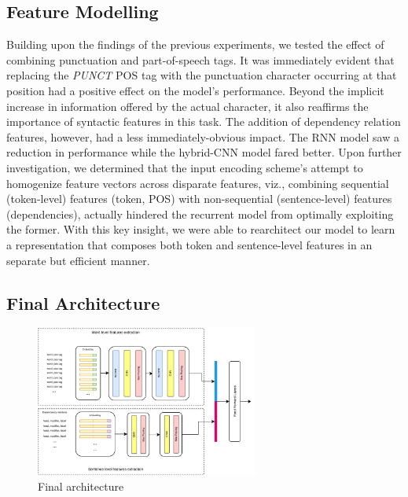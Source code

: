 \documentclass[11pt]{article}
\begin{document}
\subsection{Feature Modelling}
Building upon the findings of the previous experiments, we tested the effect of combining punctuation and part-of-speech tags. It
was immediately evident that replacing the \emph{PUNCT} POS tag with the punctuation character occurring at that position had a
positive effect on the model's performance. Beyond the implicit increase in information offered by the actual character, it
also reaffirms the importance of syntactic features in this task. The addition of dependency relation features, however, had a less
immediately-obvious impact. The RNN model saw a reduction in performance while the hybrid-CNN model fared better. Upon further
investigation, we determined that the input encoding scheme's attempt to homogenize feature vectors across disparate features, viz.,
combining sequential (token-level) features (token, POS) with non-sequential (sentence-level) features (dependencies), actually
hindered the recurrent model from optimally exploiting the former. With this key insight, we were able to rearchitect our model
to learn a representation that composes both token and sentence-level features in an separate but efficient manner.

\subsection{Final Architecture}

\begin{figure}[]
	\centering
	\includegraphics[width=0.65\textwidth]{model_arch.pdf}
	\caption{Final architecture}
	\label{fig:final_model}
\end{figure}
\end{document}
